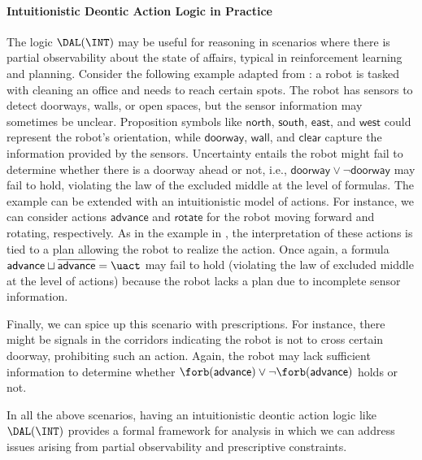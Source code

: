 \paragraph{Intuitionistic Deontic Action Logic in Practice}

The logic $\DAL(\INT)$ may be useful for reasoning in scenarios where there is partial observability about the state of affairs, typical in reinforcement learning and planning.
Consider the following example adapted from \cite{DBLP:conf/iros/CassandraKK96}: a robot is tasked with cleaning an office and needs to reach certain spots.
The robot has sensors to detect doorways, walls, or open spaces, but the sensor information may sometimes be unclear.
Proposition symbols like $\mathsf{north}$, $\mathsf{south}$, $\mathsf{east}$, and $\mathsf{west}$ could represent the robot's orientation, while $\mathsf{doorway}$, $\mathsf{wall}$, and $\mathsf{clear}$ capture the information provided by the sensors.
Uncertainty entails the robot might fail to determine whether there is a doorway ahead or not, i.e., $\mathsf{doorway} \lor \lnot\mathsf{doorway}$ may fail to hold, violating the law of the excluded middle at the level of formulas.
The example can be extended with an intuitionistic model of actions.
For instance, we can consider actions $\mathsf{advance}$ and $\mathsf{rotate}$ for the robot moving forward and rotating, respectively.
As in the example in , the interpretation of these actions is tied to a plan allowing the robot to realize the action.
Once again, a formula $\mathsf{advance} \sqcup \overline{\mathsf{advance}} = \uact$ may fail to hold (violating the law of excluded middle at the level of actions) because the robot lacks a plan due to incomplete sensor information.

Finally, we can spice up this scenario with prescriptions.
For instance, there might be signals in the corridors indicating the robot is not to cross certain doorway, prohibiting such an action.
Again, the robot may lack sufficient information to determine whether $\forb(\mathsf{advance}) \lor \lnot\forb(\mathsf{advance})$ holds or not.

In all the above scenarios, having an intuitionistic deontic action logic like $\DAL(\INT)$ provides a formal framework for analysis in which we can address issues arising from partial observability and prescriptive constraints.

